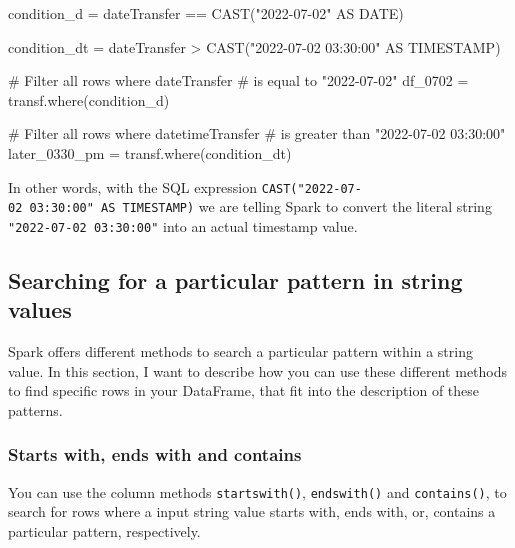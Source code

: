 \documentclass[
  11pt,
  letterpaper,
  DIV=11,
  numbers=noendperiod]{scrreprt}
\newenvironment{Shaded}{\begin{snugshade}}{\end{snugshade}}
\newcommand{\CommentTok}[1]{\textcolor[rgb]{0.37,0.37,0.37}{#1}}
\newcommand{\NormalTok}[1]{\textcolor[rgb]{0.00,0.23,0.31}{#1}}
\newcommand{\OperatorTok}[1]{\textcolor[rgb]{0.37,0.37,0.37}{#1}}
\newcommand{\StringTok}[1]{\textcolor[rgb]{0.13,0.47,0.30}{#1}}
\begin{document}
\begin{Shaded}
\begin{Highlighting}[]
\NormalTok{condition\_d }\OperatorTok{=} \StringTok{\textquotesingle{}\textquotesingle{}\textquotesingle{}}
\StringTok{dateTransfer == CAST("2022{-}07{-}02" AS DATE)}
\StringTok{\textquotesingle{}\textquotesingle{}\textquotesingle{}}

\NormalTok{condition\_dt }\OperatorTok{=} \StringTok{\textquotesingle{}\textquotesingle{}\textquotesingle{}}
\StringTok{dateTransfer \textgreater{} CAST("2022{-}07{-}02 03:30:00" AS TIMESTAMP)}
\StringTok{\textquotesingle{}\textquotesingle{}\textquotesingle{}}

\CommentTok{\# Filter all rows where \textasciigrave{}dateTransfer\textasciigrave{}}
\CommentTok{\# is equal to "2022{-}07{-}02"}
\NormalTok{df\_0702 }\OperatorTok{=}\NormalTok{ transf.where(condition\_d)}

\CommentTok{\# Filter all rows where \textasciigrave{}datetimeTransfer\textasciigrave{}}
\CommentTok{\# is greater than "2022{-}07{-}02 03:30:00"}
\NormalTok{later\_0330\_pm }\OperatorTok{=}\NormalTok{ transf.where(condition\_dt)}
\end{Highlighting}
\end{Shaded}

In other words, with the SQL expression
\texttt{CAST("2022-07-02\ 03:30:00"\ AS\ TIMESTAMP)} we are telling
Spark to convert the literal string \texttt{"2022-07-02\ 03:30:00"} into
an actual timestamp value.

\hypertarget{sec-filter-pattern-search}{%
\subsection{Searching for a particular pattern in string
values}\label{sec-filter-pattern-search}}

Spark offers different methods to search a particular pattern within a
string value. In this section, I want to describe how you can use these
different methods to find specific rows in your DataFrame, that fit into
the description of these patterns.

\hypertarget{starts-with-ends-with-and-contains}{%
\subsubsection{Starts with, ends with and
contains}\label{starts-with-ends-with-and-contains}}

You can use the column methods \texttt{startswith()},
\texttt{endswith()} and \texttt{contains()}, to search for rows where a
input string value starts with, ends with, or, contains a particular
pattern, respectively.
\end{document}

